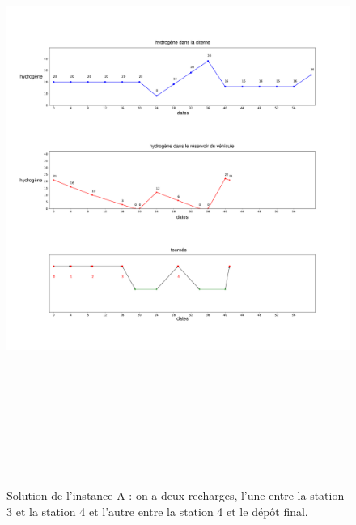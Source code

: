 \begin{figure}[H]
	\centerline{
		\includegraphics[height=20cm]{images_these/Pipe_sol_0.pdf}}
	\caption[La solution de l'instance A]{Solution de l'instance A : on a deux recharges, l'une entre la station 3 et la station 4 et l'autre entre la station 4 et le dépôt final.}
	\label{Pipe_S_Inst_0}
\end{figure}

